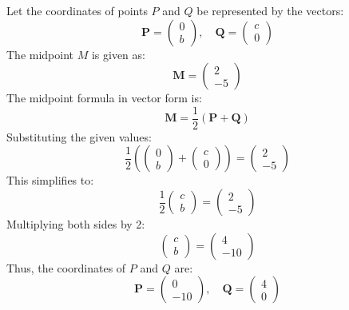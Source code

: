 \documentclass{article}
\begin{document}
Let the coordinates of points $P$ and $Q$ be represented by the vectors:
\[
\mathbf{P} = \begin{pmatrix} 0 \\ b \end{pmatrix}, \quad \mathbf{Q} = \begin{pmatrix} c \\ 0 \end{pmatrix}
\]
The midpoint $M$ is given as:
\[
\mathbf{M} = \begin{pmatrix} 2 \\ -5 \end{pmatrix}
\]
The midpoint formula in vector form is:
\[
\mathbf{M} = \frac{1}{2} (\mathbf{P} + \mathbf{Q})
\]
Substituting the given values:
\[
\frac{1}{2} \left(\begin{pmatrix} 0 \\ b \end{pmatrix} + \begin{pmatrix} c \\ 0 \end{pmatrix}\right) = \begin{pmatrix} 2 \\ -5 \end{pmatrix}
\]
This simplifies to:
\[
\frac{1}{2} \begin{pmatrix} c \\ b \end{pmatrix} = \begin{pmatrix} 2 \\ -5 \end{pmatrix}
\]
Multiplying both sides by 2:
\[
\begin{pmatrix} c \\ b \end{pmatrix} = \begin{pmatrix} 4 \\ -10 \end{pmatrix}
\]
Thus, the coordinates of $P$ and $Q$ are:
\[
\mathbf{P} = \begin{pmatrix} 0 \\ -10 \end{pmatrix}, \quad \mathbf{Q} = \begin{pmatrix} 4 \\ 0 \end{pmatrix}
\]
\end{document}
